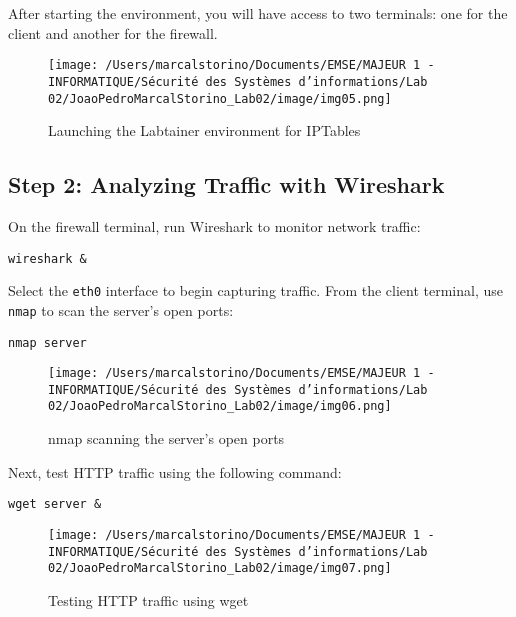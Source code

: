 \documentclass[a4paper,12pt]{article} %
\begin{document}
After starting the environment, you will have access to two terminals: one for the client and another for the firewall.

\begin{figure}[h!]
\centering
\texttt{[image: /Users/marcalstorino/Documents/EMSE/MAJEUR 1 - INFORMATIQUE/Sécurité des Systèmes d'informations/Lab 02/JoaoPedroMarcalStorino\_Lab02/image/img05.png]} %
\caption{Launching the Labtainer environment for IPTables}
\end{figure}

\subsection*{Step 2: Analyzing Traffic with Wireshark}
On the firewall terminal, run Wireshark to monitor network traffic:

\begin{verbatim}
wireshark &
\end{verbatim}

Select the \texttt{eth0} interface to begin capturing traffic. From the client terminal, use \texttt{nmap} to scan the server's open ports:

\begin{verbatim}
nmap server
\end{verbatim}

\begin{figure}[h!]
\centering
\texttt{[image: /Users/marcalstorino/Documents/EMSE/MAJEUR 1 - INFORMATIQUE/Sécurité des Systèmes d'informations/Lab 02/JoaoPedroMarcalStorino\_Lab02/image/img06.png]} %
\caption{nmap scanning the server's open ports}
\end{figure}

Next, test HTTP traffic using the following command:

\begin{verbatim}
wget server &
\end{verbatim}

\begin{figure}[h!]
\centering
\texttt{[image: /Users/marcalstorino/Documents/EMSE/MAJEUR 1 - INFORMATIQUE/Sécurité des Systèmes d'informations/Lab 02/JoaoPedroMarcalStorino\_Lab02/image/img07.png]} %
\caption{Testing HTTP traffic using wget}
\end{figure}
\end{document}
